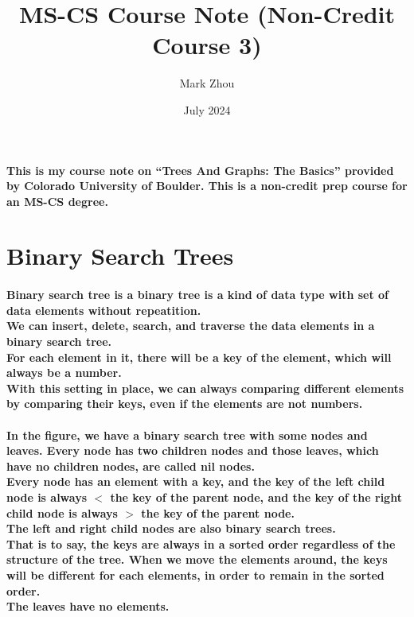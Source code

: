 \documentclass{article}
\title{MS-CS Course Note (Non-Credit Course 3)}
\author{Mark Zhou}
\date{July 2024}
\begin{document}
\maketitle
\doublespacing

\paragraph{This is my course note on “Trees And Graphs: The Basics” provided by Colorado University of Boulder. 
This is a non-credit prep course for an MS-CS degree.}

\newpage
\tableofcontents
\newpage


\section{Binary Search Trees}


\paragraph{
    Binary search tree is a binary tree is a kind of data type with set of data elements without repeatition.\\
    We can insert, delete, search, and traverse the data elements in 
    a binary search tree.\\
    For each element in it, there will be a key of the element, which will 
    always be a number.\\
    With this setting in place, we can always comparing different elements 
    by comparing their keys, even if the elements are not numbers.\\
}

\paragraph{
    In the figure, we have a binary search tree with some nodes and 
    leaves. Every node has two children nodes and those leaves, which 
    have no children nodes, are called nil nodes.\\
    Every node has an element with a key, and the key of the left child
    node is always $<$ the key of the parent node, and the key of
    the right child node is always $>$ the key of the parent node.\\
    The left and right child nodes are also binary search trees.\\
    That is to say, the keys are always in a sorted order regardless of
    the structure of the tree. When we move the elements around, the keys 
    will be different for each elements, in order to remain in the sorted 
    order.\\
    The leaves have no elements.\\
}
\end{document}

